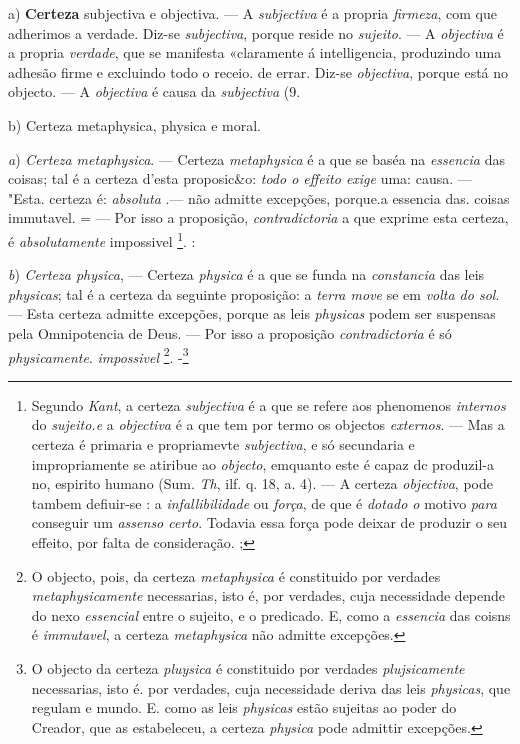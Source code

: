 a) \textbf{Certeza} subjectiva e objectiva. --- A \emph{subjectiva} é a propria \emph{firmeza}, com que adherimos a verdade. Diz-se \emph{subjectiva}, porque reside no \emph{sujeito}. --- A \emph{objectiva} é a propria \emph{verdade}, que se manifesta «claramente á intelligencia, produzindo uma adhesão firme e excluindo todo o receio. de errar. Diz-se \emph{objectiva}, porque está no objecto. --- A \emph{objectiva} é causa da \emph{subjectiva} (9.

b) Certeza metaphysica, physica e moral.

\emph{a}) \emph{Certeza metaphysica}. --- Certeza \emph{metaphysica} é a que se baséa na \emph{essencia} das coisas; tal é a certeza d'esta proposic\&o: \emph{todo o effeito exige} uma: causa. --- "Esta. certeza é: \emph{absoluta} .--- não admitte excepções, porque.a essencia das. coisas immutavel. = --- Por isso a proposição, \emph{contradictoria} a que exprime esta certeza, é \emph{absolutamente} impossivel \footnote{Segundo \emph{Kant}, a certeza \emph{subjectiva} é a que se refere aos phenomenos \emph{internos} do \emph{sujeito.e} a \emph{objectiva} é a que tem por termo os objectos \emph{externos}. --- Mas a certeza é primaria e propriamevte \emph{subjectiva}, e só secundaria e impropriamente se atiribue ao \emph{objecto}, emquanto este é capaz dc produzil-a no, espirito humano (Sum. \emph{Th}, ilf. q. 18, a. 4). --- A certeza \emph{objectiva}, pode tambem defiuir-se : a \emph{infallibilidade} ou \emph{força}, de que é \emph{dotado o} motivo \emph{para} conseguir um \emph{assenso certo}. Todavia essa força pode deixar de produzir o seu effeito, por falta de consideração. ;}. \textbar{} :

\emph{b}) \emph{Certeza physica}, --- Certeza \emph{physica} é a que se funda na \emph{constancia} das leis \emph{physicas}; tal é a certeza da seguinte proposição: a \emph{terra move} se em \emph{volta do sol}. --- Esta certeza admitte excepções, porque as leis \emph{physicas} podem ser suspensas pela Omnipotencia de Deus. --- Por isso a proposição \emph{contradictoria} é só \emph{physicamente}. \emph{impossivel} \footnote{O objecto, pois, da certeza \emph{metaphysica} é constituido por verdades \emph{metaphysicamente} necessarias, isto é, por verdades, cuja necessidade depende do nexo \emph{essencial} entre o sujeito, e o predicado. E, como a \emph{essencia} das coisns é \emph{immutavel}, a certeza \emph{metaphysica} não admitte excepções.}. -\footnote{O objecto da certeza \emph{pluysica} é constituido por verdades \emph{plujsicamente} necessarias, isto é. por verdades, cuja necessidade deriva das leis \emph{physicas}, que regulam e mundo. E. como as leis \emph{physicas} estão sujeitas ao poder do Creador, que as estabeleceu, a certeza \emph{physica} pode admittir excepções.}

